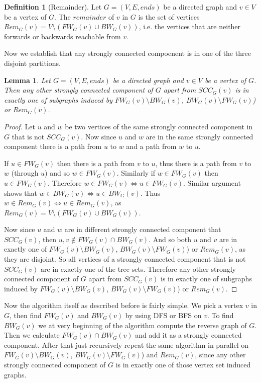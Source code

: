 \documentclass{report}
\theoremstyle{plain}
\newtheorem{lemma}{Lemma}
\theoremstyle{definition}
\newtheorem{definition}{Definition}
\theoremstyle{remark}
\numberwithin{definition}{chapter}
\numberwithin{example}{chapter}
\numberwithin{figure}{chapter}
\numberwithin{theorem}{chapter}
\numberwithin{lemma}{chapter}
\begin{document}
\begin{definition}[Remainder]
Let $G=(V, E, ends)$ be a directed graph and $v \in V$ be a vertex of $G$. The $remainder$ of $v$ in $G$ is the set of vertices $Rem_G(v)=V \setminus (FW_G(v) \cup BW_G(v))$, i.e. the vertices that are neither forwards or backwards reachable from $v$.
\end{definition}

Now we establish that any strongly connected compoenent is in one of the three disjoint partitions.

\begin{lemma}
Let $G=(V, E, ends)$ be a directed graph and $v \in V$ be a vertex of $G$. Then any other strongly connected component of $G$ apart from $SCC_G(v)$ is in exactly one of subgraphs induced by $FW_G(v) \setminus BW_G(v)$, $BW_G(v) \setminus FW_G(v)$) or $Rem_G(v)$.
\label{fw_bw_l2}
\end{lemma}

\begin{proof}
Let $u$ and $w$ be two vertices of the same strongly connected component in $G$ that is not $SCC_G(v)$. Now since $u$ and $w$ are in the same strongly connected component there is a path from $u$ to $w$ and a path from $w$ to $u$.

If $u \in FW_G(v)$ then there is a path from $v$ to $u$, thus there is a path from $v$ to $w$ (through $u$) and so $w \in FW_G(v)$. Similarly if $w \in FW_G(v)$ then $u \in FW_G(v)$. Therefore $w \in FW_G(v) \Leftrightarrow u \in FW_G(v)$. Similar argument shows that $w \in BW_G(v) \Leftrightarrow u \in BW_G(v)$.
Thus $w \in Rem_G(v) \Leftrightarrow u \in Rem_G(v)$, as $Rem_G(v)=V \setminus (FW_G(v) \cup BW_G(v))$.

Now since $u$ and $w$ are in different strongly connected component that $SCC_G(v)$, then $u,v \not \in FW_G(v) \cap BW_G(v)$. And so both $u$ and $v$ are in exactly one of $FW_G(v) \setminus BW_G(v)$, $BW_G(v) \setminus FW_G(v)$) or $Rem_G(v)$, as they are disjoint. So all vertices of a strongly connected component that is not $SCC_G(v)$ are in exactly one of the tree sets. Therefore any other strongly connected component of $G$ apart from $SCC_G(v)$ is in exactly one of subgraphs induced by $FW_G(v) \setminus BW_G(v)$, $BW_G(v) \setminus FW_G(v)$) or $Rem_G(v)$.
\end{proof}

Now the algorithm itself as described before is fairly simple. We pick a vertex $v$ in $G$, then find $FW_G(v)$ and $BW_G(v)$ by using DFS or BFS on $v$. To find $BW_G(v)$ we at very beginning of the algorithm compute the reverse graph of $G$. Then we calculate $FW_G(v) \cap BW_G(v)$ and add it as a strongly connected component. After that just recursively repeat the same algorithm in parallel on $FW_G(v) \setminus BW_G(v)$, $BW_G(v) \setminus FW_G(v)$) and $Rem_G(v)$, since any other strongly connected component of $G$ is in exactly one of those vertex set induced graphs.
\end{document}
